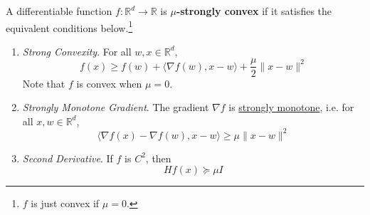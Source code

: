 	\begin{definition}
	  \label{def:mu-strongly-convex}
		A differentiable function $f: \mathbb{R}^d \to \mathbb{R}$ is \textbf{$\mu$-strongly convex} if it satisfies the equivalent conditions below.\footnote{$f$ is just convex if $\mu = 0$.} 
		\begin{enumerate}
		  \item \textit{Strong Convexity}. For all $w, x \in \mathbb{R}^d$, 
				\begin{equation}
					f(x) \geq f(w) + \langle \nabla f(w), x - w \rangle + \frac{\mu}{2} \|x - w\|^2
				\end{equation}
				Note that $f$ is convex when $\mu = 0$. 

			\item \textit{Strongly Monotone Gradient}. The gradient $\nabla f$ is \hyperref[def:strongly_monotone]{strongly monotone}, i.e. for all $x, w \in \mathbb{R}^d$, 
				\begin{equation}
				  \langle \nabla f(x) - \nabla f(w), x - w \rangle \geq \mu \|x - w\|^2
				\end{equation}

			\item \textit{Second Derivative}. If $f$ is $C^2$, then 
				\begin{equation}
					 Hf(x) \succeq \mu I 
				\end{equation}
		\end{enumerate}
	\end{definition} 

